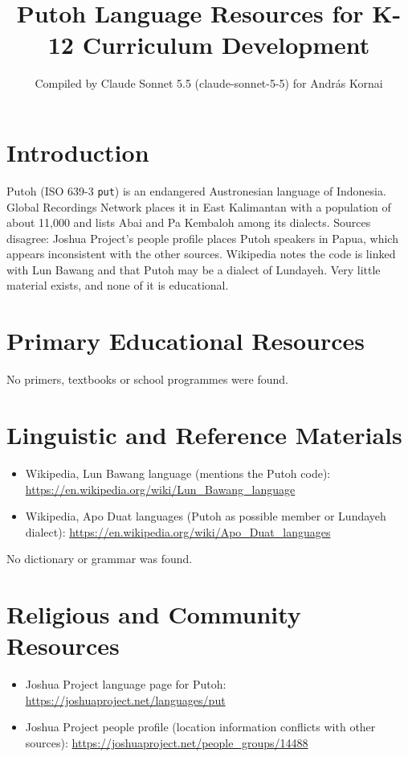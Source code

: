 \documentclass[12pt]{article}
\title{Putoh Language Resources for K-12 Curriculum Development}
\author{Compiled by Claude Sonnet 5.5 (claude-sonnet-5-5) for Andr\'as Kornai}
\date{}
\begin{document}
\maketitle

\section{Introduction}
Putoh (ISO 639-3 \texttt{put}) is an endangered Austronesian language of Indonesia. Global Recordings Network places it in East Kalimantan with a population of about 11,000 and lists Abai and Pa Kembaloh among its dialects. Sources disagree: Joshua Project's people profile places Putoh speakers in Papua, which appears inconsistent with the other sources. Wikipedia notes the code is linked with Lun Bawang and that Putoh may be a dialect of Lundayeh. Very little material exists, and none of it is educational.

\section{Primary Educational Resources}
No primers, textbooks or school programmes were found.

\section{Linguistic and Reference Materials}
\begin{itemize}
\item Wikipedia, Lun Bawang language (mentions the Putoh code): \url{https://en.wikipedia.org/wiki/Lun_Bawang_language}
\item Wikipedia, Apo Duat languages (Putoh as possible member or Lundayeh dialect): \url{https://en.wikipedia.org/wiki/Apo_Duat_languages}
\end{itemize}
No dictionary or grammar was found.

\section{Religious and Community Resources}
\begin{itemize}
\item Joshua Project language page for Putoh: \url{https://joshuaproject.net/languages/put}
\item Joshua Project people profile (location information conflicts with other sources): \url{https://joshuaproject.net/people_groups/14488}
\end{itemize}
\end{document}
